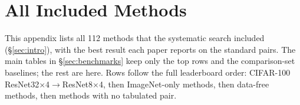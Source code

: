 \section{All Included Methods}
\label{app:methods}

This appendix lists all 112 methods that the systematic search included (\S\ref{sec:intro}), with the best
result each paper reports on the standard pairs. The main tables in \S\ref{sec:benchmarks} keep only the
top rows and the comparison-set baselines; the rest are here. Rows follow the full leaderboard order:
CIFAR-100 ResNet32$\times$4$\to$ResNet8$\times$4, then ImageNet-only methods, then data-free methods, then
methods with no tabulated pair.

